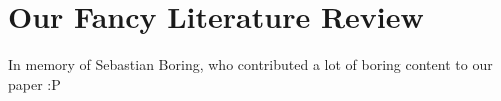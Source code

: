 \chapter{Our Fancy Literature Review}
In memory of Sebastian Boring, who contributed a lot of boring content to our paper :P